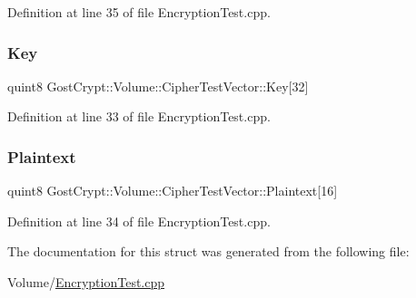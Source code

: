 Definition at line 35 of file Encryption\+Test.\+cpp.

\mbox{\label{struct_gost_crypt_1_1_volume_1_1_cipher_test_vector_a4fc528f41db39617e92dad01f5dc05d7}} 
\subsubsection{\texorpdfstring{Key}{Key}}
{\footnotesize\ttfamily quint8 Gost\+Crypt\+::\+Volume\+::\+Cipher\+Test\+Vector\+::\+Key\mbox{[}32\mbox{]}}



Definition at line 33 of file Encryption\+Test.\+cpp.

\mbox{\label{struct_gost_crypt_1_1_volume_1_1_cipher_test_vector_a6944ae7456443265db5280f69f13d25f}} 
\subsubsection{\texorpdfstring{Plaintext}{Plaintext}}
{\footnotesize\ttfamily quint8 Gost\+Crypt\+::\+Volume\+::\+Cipher\+Test\+Vector\+::\+Plaintext\mbox{[}16\mbox{]}}



Definition at line 34 of file Encryption\+Test.\+cpp.



The documentation for this struct was generated from the following file\+:\begin{DoxyCompactItemize}
\item 
Volume/\hyperlink{_encryption_test_8cpp}{Encryption\+Test.\+cpp}\end{DoxyCompactItemize}
